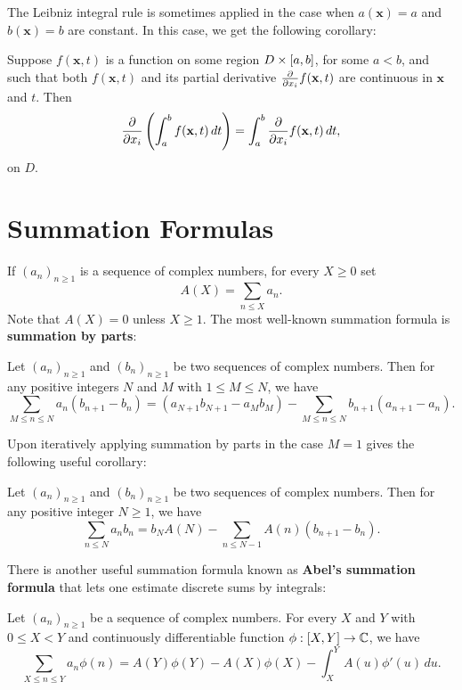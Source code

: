     The Leibniz integral rule is sometimes applied in the case when $a(\mathbf{x}) = a$ and $b(\mathbf{x}) = b$ are constant. In this case, we get the following corollary:

    \begin{corollary}
      Suppose $f(\mathbf{x},t)$ is a function on some region $D \times [a,b]$, for some $a < b$, and such that both $f(\mathbf{x},t)$ and its partial derivative $\frac{\partial}{\partial x_{i}}f(\mathbf{x},t)$ are continuous in $\mathbf{x}$ and $t$. Then
      \[
        \frac{\partial}{\partial x_{i}}\left(\int_{a}^{b}f(\mathbf{x},t)\,dt\right) = \int_{a}^{b}\frac{\partial}{\partial x_{i}}f(\mathbf{x},t)\,dt,
      \]
      on $D$.
    \end{corollary}
  \section{Summation Formulas}\label{append:Summation_Formulas}
    If $(a_{n})_{n \ge 1}$ is a sequence of complex numbers, for every $X \ge 0$ set
    \[
        A(X) = \sum_{n \le X}a_{n}.
    \]
    Note that $A(X) = 0$ unless $X \ge 1$. The most well-known summation formula is \textbf{summation by parts}:

    \begin{theorem*}
      Let $(a_{n})_{n \ge 1}$ and $(b_{n})_{n \ge 1}$ be two sequences of complex numbers. Then for any positive integers $N$ and $M$ with $1 \le M \le N$, we have
      \[
        \sum_{M \le n \le N}a_{n}(b_{n+1}-b_{n}) = (a_{N+1}b_{N+1}-a_{M}b_{M})-\sum_{M \le n \le N}b_{n+1}(a_{n+1}-a_{n}).
      \]
    \end{theorem*}

    Upon iteratively applying summation by parts in the case $M = 1$ gives the following useful corollary:

    \begin{corollary}\label{cor:summation_by_parts_corollary}
      Let $(a_{n})_{n \ge 1}$ and $(b_{n})_{n \ge 1}$ be two sequences of complex numbers. Then for any positive integer $N \ge 1$, we have
      \[
        \sum_{n \le N}a_{n}b_{n} = b_{N}A(N)-\sum_{n \le N-1}A(n)(b_{n+1}-b_{n}).
      \]
    \end{corollary}
    
    There is another useful summation formula known as \textbf{Abel's summation formula} that lets one estimate discrete sums by integrals:

    \begin{theorem*}
      Let $(a_{n})_{n \ge 1}$ be a sequence of complex numbers. For every $X$ and $Y$ with $0 \le X < Y$ and continuously differentiable function $\phi:[X,Y] \to \mathbb{C}$, we have
      \[
        \sum_{X \le n \le Y}a_{n}\phi(n) = A(Y)\phi(Y)-A(X)\phi(X)-\int_{X}^{Y}A(u)\phi'(u)\,du.
      \]
    \end{theorem*}

